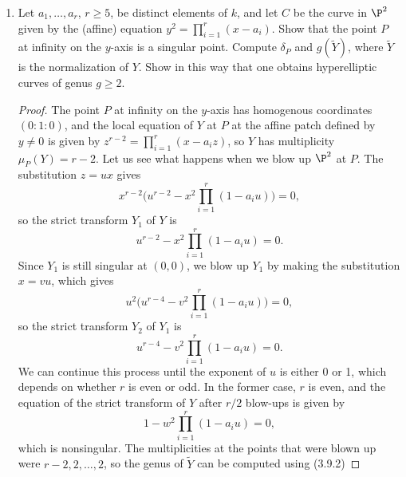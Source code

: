 \documentclass[a4paper]{article}
\begin{document}
\begin{enumerate} [label=\textbf{\arabic*.}, leftmargin=0em]
    \item[\textbf{5.}] Let $a_1, \dots, a_r$, $r \geq 5$, be distinct elements of $k$, and let $C$ be the curve in $\P^2$ given by the (affine) equation $y^2 = \prod_{i = 1}^r (x - a_i)$.
          Show that the point $P$ at infinity on the $y$-axis is a singular point.
          Compute $\delta_P$ and $g(\tilde{Y})$, where $\tilde{Y}$ is the normalization of $Y$.
          Show in this way that one obtains hyperelliptic curves of genus $g \geq 2$.

          \begin{proof}
              The point $P$ at infinity on the $y$-axis has homogenous coordinates $(0 : 1: 0)$, and the local equation of $Y$ at $P$ at the affine patch defined by $y \neq 0$ is given by $z^{r - 2} = \prod_{i = 1}^r (x - a_i z)$, so $Y$ has multiplicity $\mu_P(Y) = r - 2$.
              Let us see what happens when we blow up $\P^2$ at $P$.
              The substitution $z = ux$ gives
              \begin{equation*}
                  x^{r - 2}\bigg(u^{r - 2} - x^2 \prod_{i = 1}^r (1 - a_i u) \bigg) = 0,
              \end{equation*}
              so the strict transform $Y_1$ of $Y$ is
              \begin{equation*}
                  u^{r - 2} - x^2 \prod_{i = 1}^r (1 - a_i u) = 0.
              \end{equation*}
              Since $Y_1$ is still singular at $(0, 0)$, we blow up $Y_1$ by making the substitution $x = vu$, which gives
              \begin{equation*}
                  u^2\bigg( u^{r - 4} - v^2 \prod_{i = 1}^r (1 - a_i u)\bigg) = 0,
              \end{equation*}
              so the strict transform $Y_2$ of $Y_1$ is
              \begin{equation*}
                  u^{r - 4} - v^2 \prod_{i = 1}^r (1 - a_i u) = 0.
              \end{equation*}
              We can continue this process until the exponent of $u$ is either 0 or 1, which depends on whether $r$ is even or odd.
              In the former case, $r$ is even, and the equation of the strict transform of $Y$ after $r/2$ blow-ups is given by
              \begin{equation*}
                  1 - w^2 \prod_{i = 1}^r (1 - a_i u) = 0,
              \end{equation*}
              which is nonsingular.
              The multiplicities at the points that were blown up were $r - 2, 2, \dots, 2$, so the genus of $\tilde{Y}$ can be computed using (3.9.2)

\end{proof}
\end{enumerate}
\end{document}

